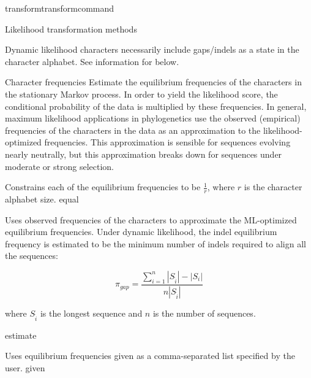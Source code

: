 \begin{command}{transform}{transformcommand}
\begin{arguments}
\begin{argumentgroup}{Likelihood transformation methods}
            \begin{statement}
                Dynamic likelihood characters necessarily include gaps/indels as
                a state in the character alphabet. See information for
                 below.
            \end{statement}

        \end{argumentgroup}

        \begin{argumentgroup} {Character frequencies} %
            Estimate the equilibrium frequencies of the characters in the stationary
            Markov process. In order to yield the likelihood score, the 
            conditional probability of the data is multiplied by these frequencies. 
            In general, maximum likelihood applications in phylogenetics use  the observed (empirical)
            frequencies of the characters in the data  as an
            approximation to the likelihood-optimized frequencies. This
            approximation is sensible for sequences evolving nearly
            neutrally, but this approximation breaks down for sequences
            under moderate or strong selection.

                {Constrains each of the equilibrium frequencies to be
                $\frac{1}{r}$, where $r$ is the character alphabet size.}
                {equal}

                {Uses observed frequencies of the characters to
                approximate the ML-optimized equilibrium
                frequencies.  Under dynamic likelihood, the indel
                equilibrium frequency is estimated to be the minimum
                number of indels required to align all the
                sequences: 
                
                \begin{equation*}
                    \pi_{gap} = \frac{\sum_{i=1}^n
                    |S_{\hat{i}}| - |S_i|}{n |S_{\hat{i}}|}
                \end{equation*}
                
                where $S_{\hat{i}}$ is the longest sequence and $n$ is the number of sequences.}
                {estimate}

                {Uses equilibrium frequencies given as a
                comma-separated list specified by the user.} 
                {given}


\end{argumentgroup}
\end{arguments}
\end{command}
